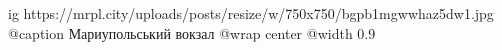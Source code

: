  
 
 
 
 

\ifcmt
  ig https://mrpl.city/uploads/posts/resize/w/750x750/bgpb1mgwwhaz5dw1.jpg
	@caption Мариупольський вокзал
  @wrap center
  @width 0.9
\fi
